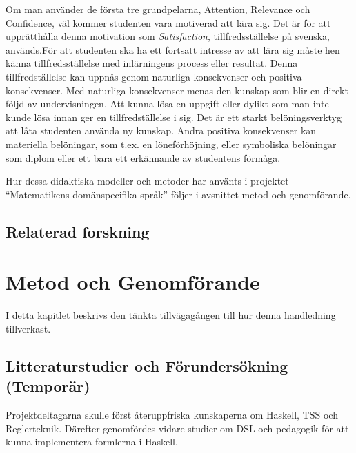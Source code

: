 \documentclass[]{article}
\begin{document}
Om man använder de första tre grundpelarna, Attention, Relevance och Confidence, väl kommer studenten vara 
motiverad att lära sig. Det är för att upprätthålla denna motivation som \textit{Satisfaction}, tillfredsställelse 
på svenska, används.För att studenten ska ha ett fortsatt intresse av att lära sig måste hen känna 
tillfredsställelse med inlärningens process eller resultat. Denna tillfredställelse kan uppnås genom 
naturliga konsekvenser och positiva konsekvenser. Med naturliga konsekvenser menas den kunskap som blir 
en direkt följd av undervisningen. Att kunna lösa en uppgift eller dylikt som man inte kunde lösa innan 
ger en tillfredställelse i sig. Det är ett starkt belöningsverktyg att låta studenten använda ny kunskap. 
Andra positiva konsekvenser kan materiella belöningar, som t.ex. en löneförhöjning,  eller symboliska 
belöningar som diplom eller ett bara ett erkännande av studentens förmåga.

Hur dessa didaktiska modeller och metoder har använts i projektet “Matematikens domänspecifika språk” 
följer i avsnittet metod och genomförande.


\subsection{Relaterad forskning}


\section{Metod och Genomförande}



I detta kapitlet beskrivs den tänkta tillvägagången till hur denna
handledning tillverkast.

\subsection{Litteraturstudier och Förundersökning (Temporär)}


Projektdeltagarna skulle först återuppfriska kunskaperna om Haskell, TSS
och Reglerteknik. Därefter genomfördes vidare studier om DSL och pedagogik för
att kunna implementera formlerna i Haskell.
\end{document}
